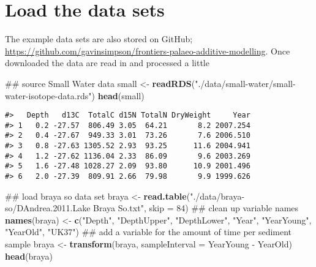 \documentclass[12pt,]{article}
\newenvironment{Shaded}{\begin{snugshade}}{\end{snugshade}}
\newcommand{\KeywordTok}[1]{\textcolor[rgb]{0.13,0.29,0.53}{\textbf{{#1}}}}
\newcommand{\DataTypeTok}[1]{\textcolor[rgb]{0.13,0.29,0.53}{{#1}}}
\newcommand{\DecValTok}[1]{\textcolor[rgb]{0.00,0.00,0.81}{{#1}}}
\newcommand{\StringTok}[1]{\textcolor[rgb]{0.31,0.60,0.02}{{#1}}}
\newcommand{\NormalTok}[1]{{#1}}
\begin{document}
\section{Load the data sets}\label{load-the-data-sets}

The example data sets are also stored on GitHub;
\url{https://github.com/gavinsimpson/frontiers-palaeo-additive-modelling}.
Once downloaded the data are read in and processed a little

\begin{Shaded}
\begin{Highlighting}[]
\NormalTok{## source Small Water data}
\NormalTok{small <-}\StringTok{ }\KeywordTok{readRDS}\NormalTok{(}\StringTok{"./data/small-water/small-water-isotope-data.rds"}\NormalTok{)}
\KeywordTok{head}\NormalTok{(small)}
\end{Highlighting}
\end{Shaded}

\begin{verbatim}
#>   Depth   d13C  TotalC d15N TotalN DryWeight     Year
#> 1   0.2 -27.57  806.49 3.05  64.21       8.2 2007.254
#> 2   0.4 -27.67  949.33 3.01  73.26       7.6 2006.510
#> 3   0.8 -27.63 1305.52 2.93  93.25      11.6 2004.941
#> 4   1.2 -27.62 1136.04 2.33  86.09       9.6 2003.269
#> 5   1.6 -27.48 1028.27 2.09  93.80      10.9 2001.496
#> 6   2.0 -27.39  809.91 2.66  79.98       9.9 1999.626
\end{verbatim}

\begin{Shaded}
\begin{Highlighting}[]
\NormalTok{## load braya so data set}
\NormalTok{braya <-}\StringTok{ }\KeywordTok{read.table}\NormalTok{(}\StringTok{"./data/braya-so/DAndrea.2011.Lake Braya So.txt"}\NormalTok{,}
                    \DataTypeTok{skip =} \DecValTok{84}\NormalTok{)}
\NormalTok{## clean up variable names}
\KeywordTok{names}\NormalTok{(braya) <-}\StringTok{ }\KeywordTok{c}\NormalTok{(}\StringTok{"Depth"}\NormalTok{, }\StringTok{"DepthUpper"}\NormalTok{, }\StringTok{"DepthLower"}\NormalTok{, }\StringTok{"Year"}\NormalTok{, }\StringTok{"YearYoung"}\NormalTok{,}
                  \StringTok{"YearOld"}\NormalTok{, }\StringTok{"UK37"}\NormalTok{)}
\NormalTok{## add a variable for the amount of time per sediment sample}
\NormalTok{braya <-}\StringTok{ }\KeywordTok{transform}\NormalTok{(braya, }\DataTypeTok{sampleInterval =} \NormalTok{YearYoung -}\StringTok{ }\NormalTok{YearOld)}
\KeywordTok{head}\NormalTok{(braya)}
\end{Highlighting}
\end{Shaded}
\end{document}

